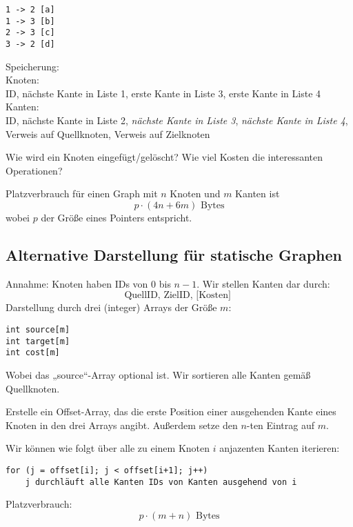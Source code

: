\documentclass[11pt]{scrbook}
\begin{document}
\begin{ex}\- 
\begin{verbatim}
1 -> 2 [a]
1 -> 3 [b]
2 -> 3 [c]
3 -> 2 [d]
\end{verbatim}
\end{ex}

Speicherung:\\
Knoten:\\
ID, nächste Kante in Liste 1, erste Kante in Liste 3, erste Kante in Liste 4
Kanten:\\
ID, nächste Kante in Liste 2, \emph{nächste Kante in Liste 3}, \emph{nächste Kante in Liste 4}, Verweis auf Quellknoten, Verweis auf Zielknoten

\begin{note}[Übung]
Wie wird ein Knoten eingefügt/gelöscht?
Wie viel Kosten die interessanten Operationen?
\end{note}

Platzverbrauch für einen Graph mit $n$ Knoten und $m$ Kanten ist
\[
p\cdot(4n + 6m) \text{ Bytes}
\]
wobei $p$ der Größe eines Pointers entspricht.


\subsection{Alternative Darstellung für statische Graphen}
Annahme: Knoten haben IDs von $0$ bis $n-1$.
Wir stellen Kanten dar durch:
\[
\text{QuellID, ZielID, [Kosten] }
\]
Darstellung durch drei (integer) Arrays der Größe $m$:
\begin{verbatim}
int source[m]
int target[m]
int cost[m]
\end{verbatim}
Wobei das „source“-Array optional ist.
Wir sortieren alle Kanten gemäß Quellknoten.

Erstelle ein Offset-Array, das die erste Position einer ausgehenden Kante eines Knoten in den drei Arrays angibt.
Außerdem setze den $n$-ten Eintrag auf $m$.

Wir können wie folgt über alle zu einem Knoten $i$ anjazenten Kanten iterieren:
\begin{verbatim}
for (j = offset[i]; j < offset[i+1]; j++)
    j durchläuft alle Kanten IDs von Kanten ausgehend von i
\end{verbatim}

Platzverbrauch:
\[
p\cdot (m+n) \text{ Bytes}
\]
\end{document}
